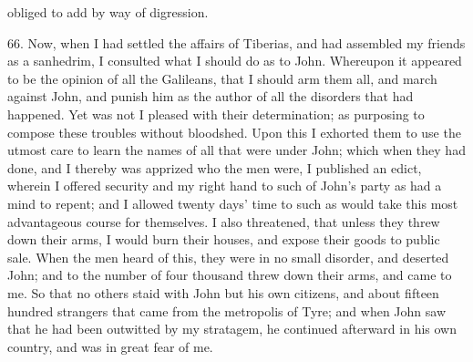obliged to add by way of digression.

66. Now, when I had settled the affairs of Tiberias, and had assembled my
friends as a sanhedrim, I consulted what I should do as to John. Whereupon
it appeared to be the opinion of all the Galileans, that I should arm them
all, and march against John, and punish him as the author of all the
disorders that had happened. Yet was not I pleased with their
determination; as purposing to compose these troubles without bloodshed.
Upon this I exhorted them to use the utmost care to learn the names of all
that were under John; which when they had done, and I thereby was apprized
who the men were, I published an edict, wherein I offered security and my
right hand to such of John's party as had a mind to repent; and I allowed
twenty days' time to such as would take this most advantageous course for
themselves. I also threatened, that unless they threw down their arms, I
would burn their houses, and expose their goods to public sale. When the
men heard of this, they were in no small disorder, and deserted John; and
to the number of four thousand threw down their arms, and came to me. So
that no others staid with John but his own citizens, and about fifteen
hundred strangers that came from the metropolis of Tyre; and when John saw
that he had been outwitted by my stratagem, he continued afterward in his
own country, and was in great fear of me.

